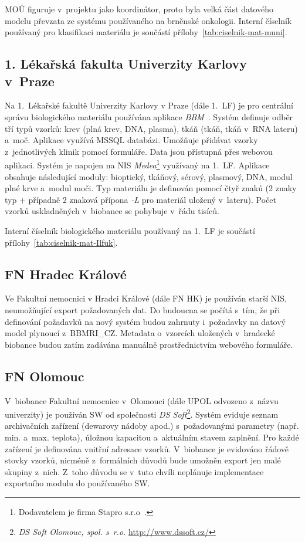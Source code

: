 \documentclass[11pt,draft,oneside]{fithesis2}
\newcommand{\ProjectName}{BBMRI\_CZ\xspace}
\begin{document}
MOÚ figuruje v~projektu jako koordinátor, proto byla velká část datového modelu převzata ze systému používaného na brněnské onkologii. Interní číselník používaný pro klasifikaci materiálu je součástí přílohy~\ref{tab:ciselnik-mat-muni}.

\subsection{1. Lékařská fakulta Univerzity Karlovy v~Praze}

Na 1.~Lékařské fakultě Univerzity Karlovy v Praze (dále 1.~LF) je pro centrální správu biologického materiálu používána aplikace \textit{BBM}~\cite{1LF_BBM}. Systém definuje odběr tří typů vzorků: krev (plná krev, DNA, plasma), tkáň (tkáň, tkáň v~RNA lateru) a~moč. Aplikace využívá MSSQL databázi. Umožňuje přidávat vzorky z~jednotlivých klinik pomocí formuláře. Data jsou přístupná přes webovou aplikaci.
Systém je napojen na NIS \textit{Medea}\footnote{Dodavatelem je firma Stapro s.r.o~\cite{Medea}.} využívaný na 1.~LF. 
Aplikace obsahuje následující moduly:  bioptický, tkáňový, sérový, plasmový, DNA, modul plné krve a~modul moči.
Typ materiálu je definován pomocí čtyř znaků (2 znaky typ + případně 2 znaková přípona \textit{-L} pro materiál uložený v~lateru). Počet vzorků uskladněných v~biobance se pohybuje v~řádu tisíců.

Interní číselník biologického materiálu používaný na 1.~LF je součástí přílohy~\ref{tab:ciselnik-mat-Ilfuk}.

\subsection{FN Hradec Králové}
Ve Fakultní nemocnici v Hradci Králové (dále FN HK) je používán starší NIS, neumožňující export požadovaných dat. Do budoucna se počítá s~tím, že při definování požadavků na nový systém budou zahrnuty i~požadavky na datový model plynoucí z~\ProjectName. Metadata o~vzorcích uložených v~hradecké biobance budou zatím zadávána manuálně prostřednictvím webového formuláře.

\subsection{FN Olomouc}
V~biobance Fakultní nemocnice v~Olomouci (dále UPOL odvozeno z~názvu univerzity) je používán SW od společnosti \textit{DS Soft}\footnote{\textit{DS Soft Olomouc, spol. s~r.o.} \url{http://www.dssoft.cz/}}. Systém eviduje seznam archivačních zařízení (dewarovy nádoby apod.) s~požadovanými parametry (např. min. a~max. teplota), úložnou kapacitou a~aktuálním stavem zaplnění. Pro každé zařízení je definována vnitřní adresace vzorků.
V~biobance je evidováno řádově stovky vzorků, nicméně z~formálních důvodů bude umožněn export jen malé skupiny z~nich. Z~toho důvodu se v~tuto chvíli neplánuje implementace exportního modulu do používaného SW.
\end{document}
